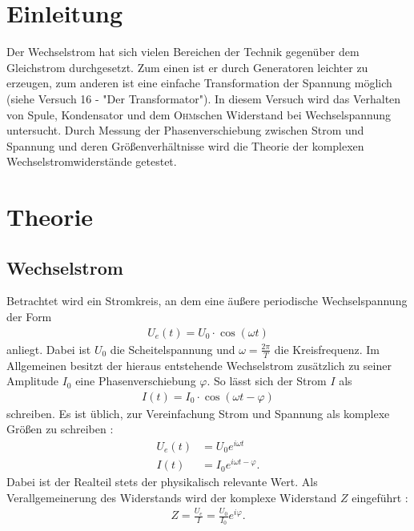 \documentclass[12pt,a4paper,titlepage,headinclude]{scrartcl}
\numberwithin{equation}{section}
\newcommand{\person}[1]{\textsc{#1}}
\begin{document}
\cleardoublepage
\tableofcontents
\thispagestyle{empty}
\cleardoublepage

\setcounter{footnote}{0}
\setcounter{page}{1}


\newpage

\section{Einleitung}
\label{sec:einleitung}
Der Wechselstrom hat sich vielen Bereichen der Technik gegenüber dem Gleichstrom durchgesetzt. Zum einen ist er durch Generatoren leichter zu erzeugen, zum anderen ist eine einfache Transformation der Spannung möglich (siehe Versuch 16 - "Der Transformator"). In diesem Versuch wird das Verhalten von Spule, Kondensator und dem \person{Ohm}schen Widerstand bei Wechselspannung untersucht. Durch Messung der Phasenverschiebung zwischen Strom und Spannung und deren Größenverhältnisse wird die Theorie der komplexen Wechselstromwiderstände getestet.
\section{Theorie}
\subsection{Wechselstrom}
\label{sec:theorie}
Betrachtet wird ein Stromkreis, an dem eine äußere periodische Wechselspannung der Form
\begin{align}
	U_e(t)=U_0\cdot\cos(\omega t)
	\label{eq:wechselspannung}
\end{align}
anliegt. Dabei ist $U_0$ die Scheitelspannung und $\omega=\frac{2\pi}{T}$ die Kreisfrequenz. Im Allgemeinen besitzt der hieraus entstehende Wechselstrom zusätzlich zu seiner Amplitude $I_0$ eine Phasenverschiebung $\varphi$. So lässt sich der Strom $I$ als
\begin{align}
	I(t)=I_0\cdot\cos(\omega t-\varphi)
	\label{eq:wechselstrom}
\end{align}
schreiben. Es ist üblich, zur Vereinfachung Strom und Spannung als komplexe Größen zu schreiben \cite[253]{nol3}:
\begin{align}
	U_e(t)&=U_0e^{i\omega t}
	\label{eq:complexspannung}\\
	I(t)&=I_0e^{i\omega t-\varphi}.
	\label{eq:complexstrom}
\end{align}
Dabei ist der Realteil stets der physikalisch relevante Wert.
Als Verallgemeinerung des Widerstands wird der komplexe Widerstand $Z$ eingeführt \cite[254]{nol3}:
\begin{align}
	Z=\frac{U_e}{I}=\frac{U_0}{I_0}e^{i\varphi}.
	\label{eq:z}
\end{align}
\end{document}
